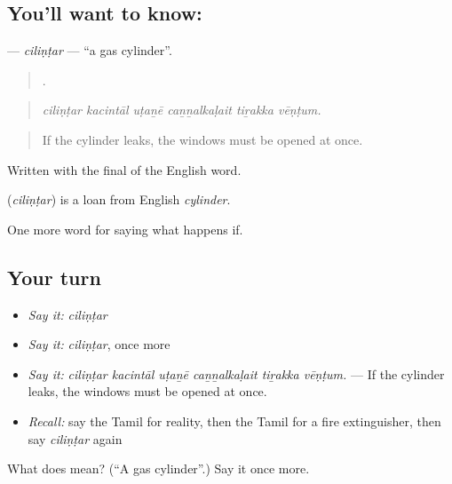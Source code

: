 \subsection*{You'll want to know: }
\textbf{} — \emph{ciliṇṭar} — \textquotedblleft{}a gas cylinder\textquotedblright{}.

\begin{quote}
     .
\end{quote}

\begin{quote}
\emph{ciliṇṭar kacintāl uṭaṉē caṉṉalkaḷait tiṟakka vēṇṭum.}
\end{quote}

\begin{quote}
If the cylinder leaks, the windows must be opened at once.
\end{quote}

Written with the final  of the English word.

\begin{cousinweb}
\textbf{} (\emph{ciliṇṭar}) is a loan from English \emph{cylinder}.
\end{cousinweb}

\begin{grammarlens}[title={What you've built}]
One more word for saying what happens if.
\end{grammarlens}

\subsection*{Your turn}
\begin{itemize}
\raggedright
  \item \emph{Say it:} \emph{ciliṇṭar}
  \item \emph{Say it:} \emph{ciliṇṭar}, once more
  \item \emph{Say it:} \emph{ciliṇṭar kacintāl uṭaṉē caṉṉalkaḷait tiṟakka vēṇṭum.} — If the cylinder leaks, the windows must be opened at once.
  \item \emph{Recall:} say the Tamil for reality, then the Tamil for a fire extinguisher, then say \emph{ciliṇṭar} again
\end{itemize}

\begin{tcolorbox}[breakable,colback=teal!4,colframe=teal!35!black,title={Before you move on}]
What does  mean? (\textquotedblleft{}A gas cylinder\textquotedblright{}.) Say it once more.
\end{tcolorbox}
